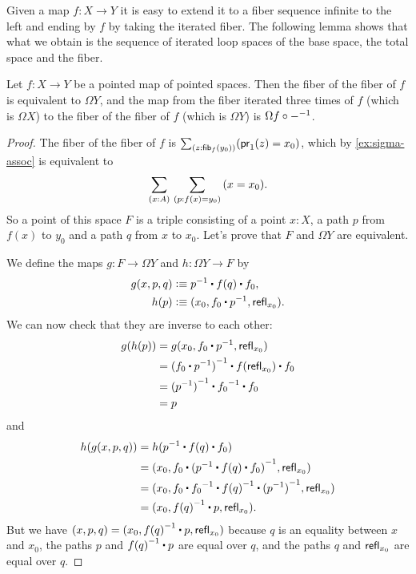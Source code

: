 Given a map $f:X\to Y$ it is easy to extend it to a fiber sequence infinite to
the left and ending by $f$ by taking the iterated fiber. The following lemma
shows that what we obtain is the sequence of iterated loop spaces of the base
space, the total space and the fiber.
%

\begin{lem}
  Let $f:X\to Y$ be a pointed map of pointed spaces. Then the fiber of the fiber
  of $f$ is equivalent to $\Omega Y$, and the map from the fiber iterated three
  times of $f$ (which is $\Omega X$) to the fiber of the fiber of $f$ (which is
  $\Omega Y$) is $\Omega f\circ\mathord{{-}^{-1}}$.
\end{lem}
\begin{proof}
  The fiber of the fiber of $f$ is $\sm{z:\hfib{f}{y_0}} (\proj{1}(z) = x_0)$, which by \autoref{ex:sigma-assoc} is equivalent to
  \begin{equation*}
    \sm{x:A}{p:f(x)=y_0} (x = x_0).
  \end{equation*}
  So a point of this space $F$ is a triple consisting of a point $x:X$, a path
  $p$ from $f(x)$ to $y_0$ and a path $q$ from $x$ to $x_0$. Let’s prove that
  $F$ and $\Omega Y$ are equivalent.

  We define the maps $g : F \to \Omega Y$ and $h : \Omega Y \to F$ by
  \begin{align*}
    g(x,p,q) &\defeq \rev{p}\ct\ap{f}{q}\ct f_0,\\
    h(p) &\defeq (x_0, f_0\ct\rev{p}, \refl{x_0}).
  \end{align*}
  We can now check that they are inverse to each other:
  \begin{align*}
    g(h(p)) &= g(x_0, f_0\ct\rev{p}, \refl{x_0}) \\
    &= \rev{(f_0\ct\rev{p})}\ct\ap{f}{\refl{x_0}}\ct f_0 \\
    &= \rev{(\rev{p})}\ct\rev{f_0}\ct f_0 \\
    &= p
  \end{align*}
  and
  \begin{align*}
    h(g(x,p,q)) &= h(\rev{p}\ct\ap{f}{q}\ct f_0)\\
    &= (x_0, f_0\ct\rev{(\rev{p}\ct\ap{f}{q}\ct f_0)}, \refl{x_0}) \\
    &= (x_0, f_0\ct\rev{f_0}\ct\rev{\ap{f}{q}}\ct\rev{(\rev{p})}, \refl{x_0}) \\
    &= (x_0, \rev{\ap{f}{q}}\ct p, \refl{x_0}).
  \end{align*}
  But we have $(x,p,q)=(x_0, \rev{\ap{f}{q}}\ct p, \refl{x_0})$ because $q$ is
  an equality between $x$ and $x_0$, the paths $p$ and $\rev{\ap{f}{q}}\ct p$
  are equal over $q$, and the paths $q$ and $\mathsf{refl}_{x_0}$ are equal over $q$.


\end{proof}
